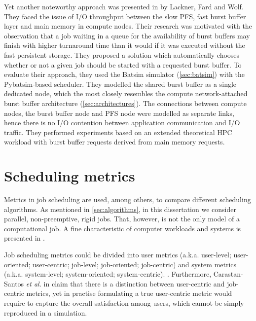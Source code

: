 \documentclass[thesis-en.tex]{subfiles}
\begin{document}
Yet another noteworthy approach was presented in \cite{8752797} by Lackner, Fard and Wolf. They faced the issue of I/O throughput between the slow PFS, fast burst buffer layer and main memory in compute nodes. Their research was motivated with the observation that a job waiting in a queue for the availability of burst buffers may finish with higher turnaround time than it would if it was executed without the fast persistent storage. They proposed a solution which automatically chooses whether or not a given job should be started with a requested burst buffer. To evaluate their approach, they used the Batsim simulator (\autoref{sec:batsim}) with the Pybatsim-based scheduler. They modelled the shared burst buffer as a single dedicated node, which the most closely resembles the compute network-attached burst buffer architecture (\autoref{sec:architectures}). The connections between compute nodes, the burst buffer node and PFS node were modelled as separate links, hence there is no I/O contention between application communication and I/O traffic. They performed experiments based on an extended theoretical HPC workload with burst buffer requests derived from main memory requests. 

\section{Scheduling metrics} \label{sec:metrics}
Metrics in job scheduling are used, among others, to compare different scheduling algorithms. As mentioned in \autoref{sec:algorithms}, in this dissertation we consider parallel, non-preemptive, rigid jobs. That, however, is not the only model of a computational job. A fine characteristic of computer workloads and systems is presented in \cite{10.1007/BFb0053978}.

Job scheduling metrics could be divided into user metrics (a.k.a. user-level; user-oriented; user-centric; job-level; job-oriented; job-centric) and system metrics (a.k.a. system-level; system-oriented; system-centric). \cite{10.1007/3-540-47954-6_4,srinivasan2002selective,eyerman2008system,8752660,10.1145/3307681.3325401}. Furthermore, Carastan-Santos \textit{et al.} in \cite{8752660} claim that there is a distinction between user-centric and job-centric metrics, yet in practise formulating a true user-centric metric would require to capture the overall satisfaction among users, which cannot be simply reproduced in a simulation.
\end{document}
